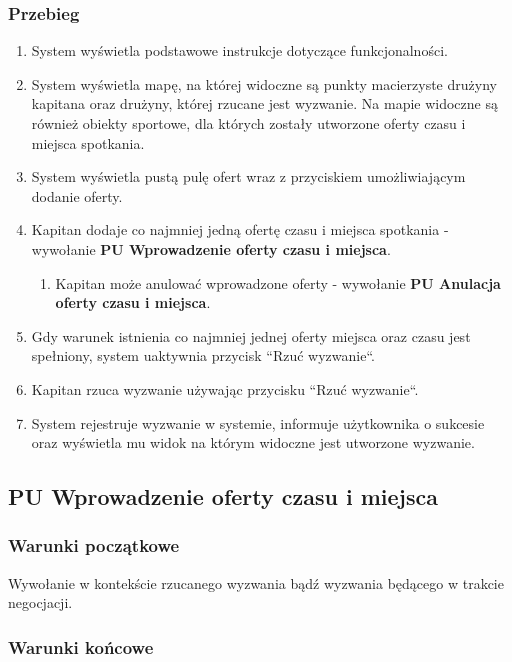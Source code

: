 \subsubsection{Przebieg}

\begin{enumerate}
  \item System wyświetla podstawowe instrukcje dotyczące funkcjonalności.
  \item System wyświetla mapę, na której widoczne są punkty macierzyste drużyny kapitana oraz drużyny, której rzucane jest wyzwanie. Na mapie widoczne są również obiekty sportowe, dla których zostały utworzone oferty czasu i miejsca spotkania.
  \item System wyświetla pustą pulę ofert wraz z przyciskiem umożliwiającym dodanie oferty.
  \item Kapitan dodaje co najmniej jedną ofertę czasu i miejsca spotkania - wywołanie \textbf{PU Wprowadzenie oferty czasu i miejsca}.
  \begin{enumerate}[label=(\alph*)]
     \item Kapitan może anulować wprowadzone oferty - wywołanie \textbf{PU Anulacja oferty czasu i miejsca}.
   \end{enumerate}
  \item Gdy warunek istnienia co najmniej jednej oferty miejsca oraz czasu jest spełniony, system uaktywnia przycisk ``Rzuć wyzwanie``.
  \item Kapitan rzuca wyzwanie używając przycisku ``Rzuć wyzwanie``.
  \item System rejestruje wyzwanie w systemie, informuje użytkownika o sukcesie oraz wyświetla mu widok na którym widoczne jest utworzone wyzwanie.
\end{enumerate}

\subsection*{PU Wprowadzenie oferty czasu i miejsca}

\subsubsection{Warunki początkowe}

Wywołanie w kontekście rzucanego wyzwania bądź wyzwania będącego w trakcie negocjacji.

\subsubsection{Warunki końcowe}

